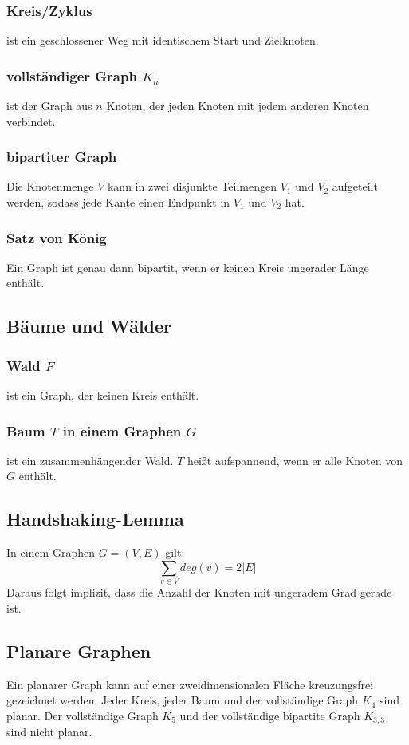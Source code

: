 \documentclass[10pt,a4paper,landscape]{article}
\begin{document}
\begin{multicols*}{2}
    \subsubsection*{ Kreis/Zyklus } ist ein geschlossener Weg mit identischem Start und Zielknoten.

    \subsubsection*{ vollständiger Graph $K_{n}$ } ist der Graph aus $n$ Knoten, der jeden Knoten mit jedem anderen Knoten verbindet.
    \subsubsection*{ bipartiter Graph } Die Knotenmenge $V$ kann in zwei disjunkte Teilmengen $V_1$ und $V_2$ aufgeteilt werden, sodass jede Kante einen 
    Endpunkt in $V_1$ und $V_2$ hat.
    \subsubsection*{ Satz von König }
    Ein Graph ist genau dann bipartit, wenn er keinen Kreis ungerader Länge enthält.

    \subsection{ Bäume und Wälder }
    \subsubsection*{ Wald $F$ } ist ein Graph, der keinen Kreis enthält.
    \subsubsection*{ Baum $T$ in einem Graphen $G$ } ist ein zusammenhängender Wald. $T$ heißt aufspannend, wenn er alle Knoten von $G$ enthält. 

    \subsection{ Handshaking-Lemma }
    In einem Graphen $G = (V, E)$ gilt:
    \[ \sum_{v\in V} deg(v) = 2|E| \]
    Daraus folgt implizit, dass die Anzahl der Knoten mit ungeradem Grad gerade ist.

    \subsection{ Planare Graphen }
    Ein planarer Graph kann auf einer zweidimensionalen Fläche kreuzungsfrei gezeichnet werden. Jeder Kreis, 
    jeder Baum und der vollständige Graph $K_4$ sind planar. Der vollständige Graph $K_5$ und der vollständige 
    bipartite Graph $K_{3,3}$ sind nicht planar.

\end{multicols*}
\end{document}
